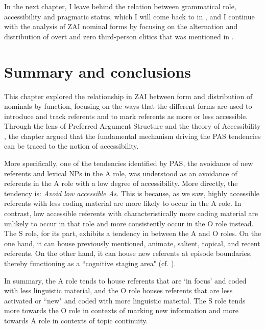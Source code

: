 In the next chapter, I leave behind the relation between grammatical role, accessibility and pragmatic status, which I will come back to in , and I continue with the analysis of ZAI nominal forms by focusing on the alternation and distribution of overt and zero third-person clitics that was mentioned in . 




\section{Summary and conclusions}


This chapter explored the relationship in ZAI between form and distribution of nominals by function, focusing on the ways that the different forms are used to introduce and track referents and to mark referents as more or less accessible. Through the lens of Preferred Argument Structure \citep{dubois2003a} and the theory of Accessibility \citep{ariel2001}, the chapter argued that the fundamental mechanism driving the PAS tendencies can be traced to the notion of accessibility. 

More specifically, one of the tendencies identified by PAS, the avoidance of new referents and lexical NPs in the A role, was understood as an avoidance of referents in the A role with a low degree of accessibility. More directly, the tendency is: \textit{Avoid low accessible As.} This is because, as we saw, highly accessible referents with less coding material are more likely to occur in the A role. In contrast, low accessible referents with characteristically more coding material are unlikely to occur in that role and more consistently occur in the O role instead. The S role, for its part, exhibits a tendency in between the A and O roles. On the one hand, it can house previously mentioned, animate, salient, topical, and recent referents. On the other hand, it can house new referents at episode boundaries, thereby functioning as a ``cognitive staging area" (cf. ).

In summary, the A role tends to house referents that are `in focus' \citep{gundel1993} and coded with less linguistic material, and the O role houses referents that are less activated or ``new" and coded with more linguistic material. The S role tends more towards the O role in contexts of marking new information and more towards A role in contexts of topic continuity.

